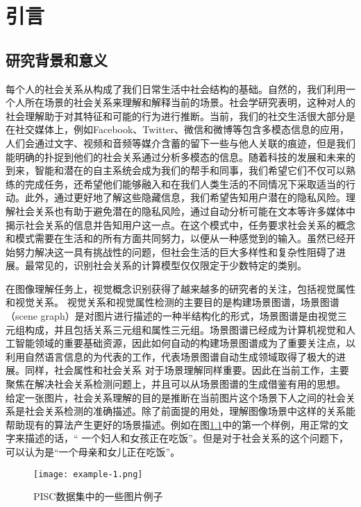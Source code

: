 

\chapter{引言}
\label{ch:intro}

\section{研究背景和意义}

每个人的社会关系从构成了我们日常生活中社会结构的基础。自然的，我们利用一个人所在场景的社会关系来理解和解释当前的场景。社会学研究表明，这种对人的社会理解助于对其特征和可能的行为进行推断。当前，我们的社交生活很大部分是在社交媒体上，例如Facebook、Twitter、微信和微博等包含多模态信息的应用，人们会通过文字、视频和音频等媒介含蓄的留下一些与他人关联的痕迹，但是我们能明确的扑捉到他们的社会关系通过分析多模态的信息。随着科技的发展和未来的到来，智能和潜在的自主系统会成为我们的帮手和同事，我们希望它们不仅可以熟练的完成任务，还希望他们能够融入和在我们人类生活的不同情况下采取适当的行动。此外，通过更好地了解这些隐藏信息，我们希望告知用户潜在的隐私风险。理解社会关系也有助于避免潜在的隐私风险，通过自动分析可能在文本等许多媒体中揭示社会关系的信息并告知用户这一点。在这个模式中，任务要求社会关系的概念和模式需要在生活和的所有方面共同努力，以便从一种感觉到的输入。虽然已经开始努力解决这一具有挑战性的问题，但社会生活的巨大多样性和复杂性阻碍了进展。最常见的，识别社会关系的计算模型仅仅限定于少数特定的类别。

在图像理解任务上，视觉概念识别获得了越来越多的研究者的关注，包括视觉属性和视觉关系\cite{lu2016visual}。
视觉关系和视觉属性检测的主要目的是构建场景图谱，场景图谱（scene graph）\cite{johnson2015image}是对图片进行描述的一种半结构化的形式，场景图谱是由视觉三元组构成，并且包括关系三元组和属性三元组。场景图谱已经成为计算机视觉和人工智能领域的重要基础资源，因此如何自动的构建场景图谱成为了重要关注点，以利用自然语言信息的\cite{lu2016visual}为代表的工作，代表场景图谱自动生成领域取得了极大的进展。同样，社会属性和社会关系\cite{wang2010seeing} 对于场景理解同样重要。因此在当前工作，主要聚焦在解决社会关系检测问题上，并且可以从场景图谱的生成借鉴有用的思想。
给定一张图片，社会关系理解的目的是推断在当前图片这个场景下人之间的社会关系是社会关系检测的准确描述。除了前面提的用处，理解图像场景中这样的关系能帮助现有的算法产生更好的场景描述。例如在图\ref{fig:intro-example}中的第一个样例，用正常的文字来描述的话，`` 一个妇人和女孩正在吃饭''。但是对于社会关系的这个问题下，可以认为是``一个母亲和女儿正在吃饭''。
\begin{figure}[htpb]
	\centering
	\texttt{[image: example-1.png]}
    \caption{PISC数据集中的一些图片例子}
	\vspace*{-3.5mm}
	\label{fig:intro-example}
\end{figure}

